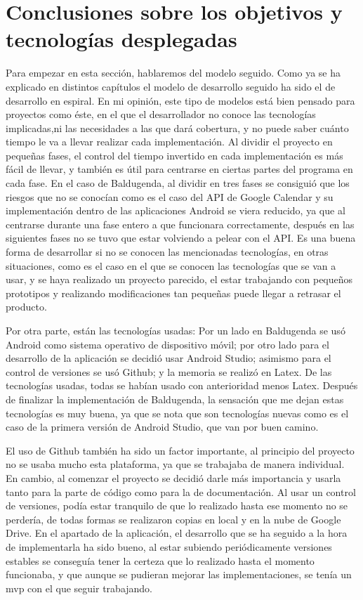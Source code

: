 \section{Conclusiones sobre los objetivos y tecnologías desplegadas}
\label{secc:Conclusiones sobre los objetivos}

Para empezar en esta sección, hablaremos del modelo seguido. Como ya se ha explicado en distintos capítulos el modelo de desarrollo seguido ha sido el de desarrollo en espiral. En mi opinión, este tipo de modelos está bien pensado para proyectos como éste, en el que el desarrollador no conoce las tecnologías implicadas,ni las necesidades a las que dará cobertura, y no puede saber cuánto tiempo le va a llevar realizar cada implementación. Al dividir el proyecto en pequeñas fases, el control del tiempo invertido en cada implementación es más fácil de llevar, y también es útil para centrarse en ciertas partes del programa en cada fase. En el caso de Baldugenda, al dividir en tres fases se consiguió que los riesgos que no se conocían como es el caso del API de Google Calendar y su implementación dentro de las aplicaciones Android se viera reducido, ya que al centrarse durante una fase entero a que funcionara correctamente, después en las siguientes fases no se tuvo que estar volviendo a pelear con el API. Es una buena forma de desarrollar si no se conocen las mencionadas tecnologías, en otras situaciones, como es el caso en el que se conocen las tecnologías que se van a usar, y se haya realizado un proyecto parecido, el estar trabajando con pequeños prototipos y realizando modificaciones tan pequeñas puede llegar a retrasar el producto.

Por otra parte, están las tecnologías usadas: Por un lado en Baldugenda se usó Android como sistema operativo de dispositivo móvil; por otro lado para el desarrollo de la aplicación se decidió usar Android Studio; asimismo para el control de versiones se usó Github; y la memoria se realizó en Latex. De las tecnologías usadas, todas se habían usado con anterioridad menos Latex. Después de finalizar la implementación de Baldugenda,  la sensación que me dejan estas tecnologías es muy buena, ya que se nota que son tecnologías nuevas como es el caso de la primera versión de Android Studio, que van por buen camino. 

El uso de Github también ha sido un factor importante, al principio del proyecto no se usaba mucho esta plataforma, ya que se trabajaba de manera individual. En cambio, al comenzar el proyecto se decidió darle más importancia y usarla tanto para la parte de código como para la de documentación. Al usar un control de versiones, podía estar tranquilo de que lo realizado hasta ese momento no se perdería, de todas formas se realizaron copias en local y en la nube de Google Drive.
\newpage
En el apartado de la aplicación, el desarrollo que se ha seguido a la hora de implementarla ha sido bueno, al estar subiendo periódicamente versiones estables se conseguía tener la certeza que lo realizado hasta el momento funcionaba, y que aunque se pudieran mejorar las implementaciones, se tenía un \acrshort{mvp} con el que seguir trabajando.

